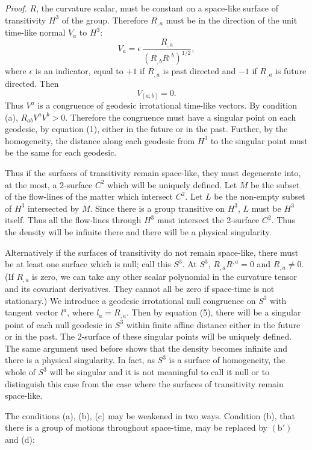 \emph{Proof.} $R$, the curvature scalar, must be constant on a space-like
surface of transitivity $H^3$ of the group. Therefore $R_{,a}$ must be in the
direction of the unit time-like normal $V_a$ to $H^3$:
\[
V_a=\epsilon\,\frac{R_{,a}}{(R_{,b}R^{,b})^{1/2}},
\]
where $\epsilon$ is an indicator, equal to $+1$ if $R_{,a}$ is past directed
and $-1$ if $R_{,a}$ is future directed. Then
\[
V_{[a;b]}=0.
\]
Thus $V^a$ is a congruence of geodesic irrotational time-like vectors. By
condition (a), $R_{ab}V^aV^b>0$. Therefore the congruence must have a singular
point on each geodesic, by equation (1), either in the future or in the past.
Further, by the homogeneity, the distance along each geodesic from $H^3$ to
the singular point must be the same for each geodesic.

Thus if the surfaces of transitivity remain space-like, they must degenerate
into, at the most, a 2-surface $C^2$ which will be uniquely defined. Let $M$
be the subset of the flow-lines of the matter which intersect $C^2$. Let $L$
be the non-empty subset of $H^3$ intersected by $M$. Since there is a group
transitive on $H^3$, $L$ must be $H^3$ itself. Thus all the flow-lines through
$H^3$ must intersect the 2-surface $C^2$. Thus the density will be infinite
there and there will be a physical singularity.

Alternatively if the surfaces of transitivity do not remain space-like,
there must be at least one surface which is null; call this $S^3$. At $S^3$,
$R_{,a}R^{,a}=0$ and $R_{,a}\neq0$. (If $R_{,a}$ is zero, we can take any
other scalar polynomial in the curvature tensor and its covariant
derivatives. They cannot all be zero if space-time is not stationary.) We
introduce a geodesic irrotational null congruence on $S^3$ with tangent vector
$l^a$, where $l_a=R_{,a}$. Then by equation (5), there will be a singular
point of each null geodesic in $S^3$ within finite affine distance either in
the future or in the past. The 2-surface of these singular points will be
uniquely defined. The same argument used before shows that the density becomes
infinite and there is a physical singularity. In fact, as $S^3$ is a surface
of homogeneity, the whole of $S^3$ will be singular and it is not meaningful
to call it null or to distinguish this case from the case where the surfaces
of transitivity remain space-like.

The conditions (a), (b), (c) may be weakened in two ways. Condition (b), that
there is a group of motions throughout space-time, may be replaced by
$(\mathrm{b}')$ and (d):

